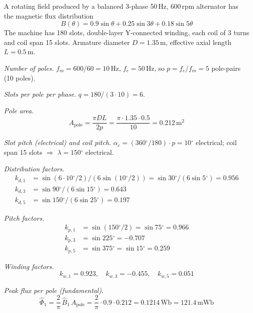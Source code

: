 \documentclass[12pt,a4paper]{article}
\newcommand{\unit}[1]{\ensuremath{\,\mathrm{#1}}}
\newcommand{\degree}{\ensuremath{^{\circ}}}
\begin{document}
A rotating field produced by a balanced 3-phase 50\unit{Hz}, 600\unit{rpm}
alternator has the magnetic flux distribution
\begin{equation}
  B(\theta) = 0.9\sin\theta + 0.25\sin 3\theta + 0.18\sin 5\theta
\end{equation}
The machine has 180 slots, double-layer Y-connected winding, each coil
of 3 turns and coil span 15 slots. Armature diameter $D = 1.35\unit{m}$,
effective axial length $L = 0.5\unit{m}$.

\emph{Number of poles.}
$f_m = 600/60 = 10\unit{Hz}$, $f_e = 50\unit{Hz}$, so
$p = f_e/f_m = 5$ pole-pairs (10 poles).

\emph{Slots per pole per phase.}
$q = 180/(3\cdot 10) = 6$.

\emph{Pole area.}
\begin{equation}
  A_\text{pole} = \frac{\pi D L}{2p}
                = \frac{\pi \cdot 1.35 \cdot 0.5}{10}
                = 0.212\unit{m^2}
\end{equation}

\emph{Slot pitch (electrical) and coil pitch.}
$\alpha_e = (360\degree/180)\cdot p = 10\degree$ electrical;
coil span 15 slots $\Rightarrow$ $\lambda = 150\degree$ electrical.

\emph{Distribution factors.}
\begin{align*}
  k_{d,1} &= \sin(6\cdot 10\degree/2)/(6\sin(10\degree/2))
           = \sin 30\degree / (6\sin 5\degree)
           = 0.956\\
  k_{d,3} &= \sin 90\degree / (6\sin 15\degree) = 0.643\\
  k_{d,5} &= \sin 150\degree / (6\sin 25\degree) = 0.197
\end{align*}

\emph{Pitch factors.}
\begin{align*}
  k_{p,1} &= \sin(150\degree/2) = \sin 75\degree = 0.966\\
  k_{p,3} &= \sin 225\degree = -0.707\\
  k_{p,5} &= \sin 375\degree = \sin 15\degree = 0.259
\end{align*}

\emph{Winding factors.}
\begin{equation}
  k_{w,1} = 0.923,\quad
  k_{w,3} = -0.455,\quad
  k_{w,5} = 0.051
\end{equation}

\emph{Peak flux per pole (fundamental).}
\begin{equation}
  \hat{\Phi}_1 = \frac{2}{\pi}\,\hat{B}_1\,A_\text{pole}
               = \frac{2}{\pi}\cdot 0.9\cdot 0.212 = 0.1214\unit{Wb}
               = 121.4\unit{mWb}
\end{equation}
\end{document}
